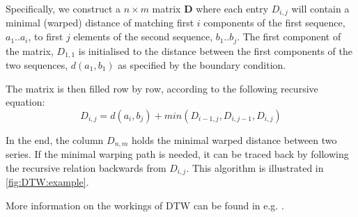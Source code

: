 \documentclass[parskip]{cs4rep}
\begin{document}
Specifically, we construct a $n \times m$ matrix $\mathbf{D}$ where each entry $D_{i,j}$ will contain a minimal (warped) distance of matching first $i$ components of the first sequence, $a_1..a_i$, to first $j$ elements of the second sequence, $b_1..b_j$. The first component of the matrix, $D_{1,1}$ is initialised to the distance between the first components of the two sequences, $d(a_1, b_1)$ as specified by the boundary condition.

The matrix is then filled row by row, according to the following recursive equation:
\begin{equation}\label{eq:dtw_equation}
D_{i,j} = d(a_i, b_j) + min(D_{i-1, j}, D_{i, j-1}, D_{i,j})
\end{equation}

In the end, the column $D_{n,m}$ holds the minimal warped distance between two series.
If the minimal warping path is needed, it can be traced back by following the recursive relation backwards from $D_{i,j}$. This algorithm is illustrated in \autoref{fig:DTW:example}. 

More information on the workings of DTW can be found in e.g. \citep{Muller:2007bo}.
\end{document}

